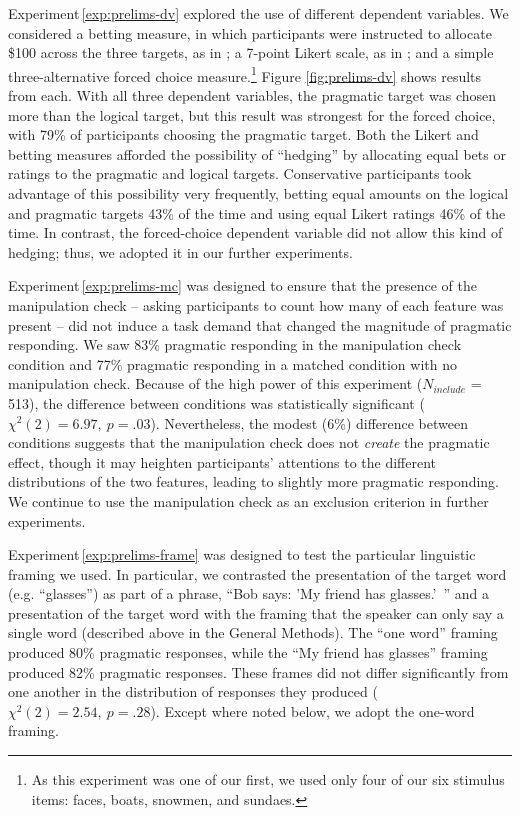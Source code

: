 \documentclass[man,noapacite]{apa2}
\newcounter{Experiment}
\newcommand{\exptref}[1]{Experiment\,\ref{#1}}
\begin{document}
\exptref{exp:prelims-dv} explored the use of different dependent variables. We considered a betting measure, in which participants were instructed to allocate \$100 across the three targets, as in ; a 7-point Likert scale, as in ; and a simple three-alternative forced choice measure.\footnote{As this experiment was one of our first, we used only four of our six stimulus items: faces, boats, snowmen, and sundaes.} Figure \ref{fig:prelims-dv} shows results from each. With all three dependent variables, the pragmatic target was chosen more than the logical target, but this result was strongest for the forced choice, with 79\% of participants choosing the pragmatic target. Both the Likert and betting measures afforded the possibility of ``hedging'' by allocating equal bets or ratings to the pragmatic and logical targets. Conservative participants took advantage of this possibility very frequently, betting equal amounts on the logical and pragmatic targets 43\% of the time and using equal Likert ratings 46\% of the time. In contrast, the forced-choice dependent variable did not allow this kind of hedging; thus, we adopted it in our further experiments.

\exptref{exp:prelims-mc} was designed to ensure that the presence of the manipulation check -- asking participants to count how many of each feature was present -- did not induce a task demand that changed the magnitude of pragmatic responding. We saw 83\% pragmatic responding in the manipulation check condition and 77\% pragmatic responding in a matched condition with no manipulation check. Because of the high power of this experiment ($N_{include}$ = 513), the difference between conditions was statistically significant ($\chi^2(2) = 6.97,~p = .03$). Nevertheless, the modest (6\%) difference between conditions suggests that the manipulation check does not \emph{create} the pragmatic effect, though it may heighten participants' attentions to the different distributions of the two features, leading to slightly more pragmatic responding. We continue to use the manipulation check as an exclusion criterion in further experiments.

\exptref{exp:prelims-frame} was designed to test the particular linguistic framing we used. In particular, we contrasted the presentation of the target word (e.g. ``glasses'') as part of a phrase, ``Bob says: 'My friend has glasses.'~'' and a presentation of the target word with the framing that the speaker can only say a single word (described above in the General Methods). The ``one word'' framing produced 80\% pragmatic responses, while the ``My friend has glasses'' framing produced 82\% pragmatic responses. These frames did not differ significantly from one another in the distribution of responses they produced ($\chi^2(2) = 2.54,~p = .28$). Except where noted below, we adopt the one-word framing.
\end{document}
